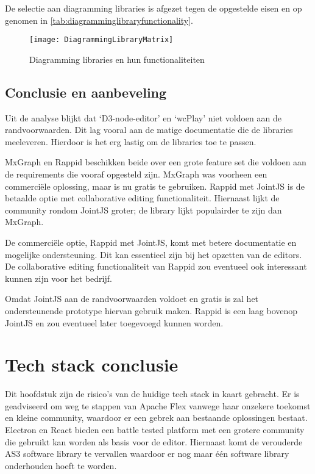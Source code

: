 \noindent De selectie aan diagramming libraries is afgezet tegen de opgestelde eisen en op genomen in \autoref{tab:diagramminglibraryfunctionality}.

\begin{figure}[H]
    \texttt{[image: DiagrammingLibraryMatrix]}
    \caption[]{Diagramming libraries en hun functionaliteiten \footnotemark}
    \label{tab:diagramminglibraryfunctionality}
    \centering
\end{figure}

\subsection{Conclusie en aanbeveling}
Uit de analyse blijkt dat ‘D3-node-editor’ en ‘wcPlay’ niet voldoen aan de randvoorwaarden. Dit lag vooral aan de matige documentatie die de libraries meeleveren. Hierdoor is het erg lastig om de libraries toe te passen.

MxGraph en Rappid beschikken beide over een grote feature set die voldoen aan de requirements die vooraf opgesteld zijn. MxGraph was voorheen een commerciële oplossing, maar is nu gratis te gebruiken. Rappid met JointJS is de betaalde optie met collaborative editing functionaliteit. Hiernaast lijkt de community rondom JointJS groter; de library lijkt populairder te zijn dan MxGraph.

De commerciële optie, Rappid met JointJS, komt met betere documentatie en mogelijke ondersteuning. Dit kan essentieel zijn bij het opzetten van de editors. De collaborative editing functionaliteit van Rappid zou eventueel ook interessant kunnen zijn voor het bedrijf.

Omdat JointJS aan de randvoorwaarden voldoet en gratis is zal het ondersteunende prototype hiervan gebruik maken. Rappid is een laag bovenop JointJS en zou eventueel later toegevoegd kunnen worden.

\section{Tech stack conclusie}
Dit hoofdstuk zijn de risico’s van de huidige tech stack in kaart gebracht. Er is geadviseerd om weg te stappen van Apache Flex vanwege haar onzekere toekomst en kleine community, waardoor er een gebrek aan bestaande oplossingen bestaat. Electron en React bieden een battle tested platform met een grotere community die gebruikt kan worden als basis voor de editor. Hiernaast komt de verouderde AS3 software library te vervallen waardoor er nog maar één software library onderhouden hoeft te worden.

